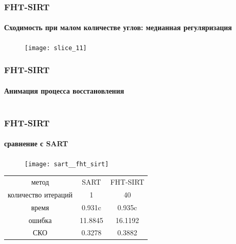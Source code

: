 \begin{frame}
\frametitle{FHT-SIRT}
\framesubtitle{Сходимость при малом количестве углов: медианная регуляризация}

\begin{figure}
\texttt{[image: slice\_11]}
\end{figure}

\end{frame}

\begin{frame}
\frametitle{FHT-SIRT}
\framesubtitle{Анимация процесса восстановления}
\begin{columns}[T,onlytextwidth]
\begin{column}{0.4\textwidth}
\end{column}

\begin{column}{0.6\textwidth}
\end{column}
\end{columns}
\end{frame}


\begin{frame}
\frametitle{FHT-SIRT}
\framesubtitle{сравнение с SART}
  \begin{figure}
  \texttt{[image: sart\_\_fht\_sirt]}
  \end{figure}

\vspace{1cm}


\small
\begin{tabular}{c|c c}
    метод & SART & FHT-SIRT \\
    количество итераций & 1 & 40 \\
    время & 0.931c & 0.935c \\
    ошибка & 11.8845 & 16.1192 \\
    СКО & 0.3278 & 0.3882 \\
\end{tabular}

\end{frame}


